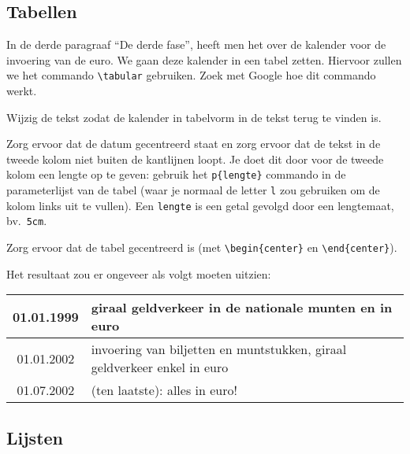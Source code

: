 \documentclass[12pt, dutch]{article}
\newcommand{\bs}{\textbackslash}
\begin{document}
\subsection{Tabellen}

In de derde paragraaf ``De derde fase'', heeft men het over de
kalender voor de invoering van de euro. We gaan deze kalender in een
tabel zetten. Hiervoor zullen we het commando \texttt{\bs{}tabular}
gebruiken. Zoek met Google hoe dit commando werkt.
\begin{tcolorbox}[title=Opgave 5a]
  Wijzig de tekst zodat de kalender in tabelvorm in de tekst terug te vinden is.
\end{tcolorbox}
Zorg ervoor dat de datum gecentreerd staat en zorg ervoor dat de
tekst in de tweede kolom niet buiten de kantlijnen loopt. Je doet dit
door voor de tweede kolom een lengte op te geven: gebruik het
\texttt{p\{lengte\}} commando in de parameterlijst van de
tabel (waar je normaal de letter \texttt{l} zou gebruiken om de kolom
links uit te vullen). Een \texttt{lengte} is een getal gevolgd door een
lengtemaat, bv.\ \texttt{5cm}.

\begin{tcolorbox}[title=Opgave 5b]
  Zorg ervoor dat de tabel gecentreerd is (met \texttt{\bs{}begin\{center\}} en
  \texttt{\bs{}end\{center\}}).
\end{tcolorbox}

Het resultaat zou er ongeveer als volgt moeten uitzien:

\begin{center}
  \begin{tabular}{|c|p{7cm}|}
    \hline
    01.01.1999 & giraal geldverkeer in de nationale munten en in euro                     \\ \hline
    01.01.2002 & invoering van biljetten en muntstukken, giraal geldverkeer enkel in euro \\ \hline
    01.07.2002 & (ten laatste): alles in euro!                                            \\ \hline
  \end{tabular}
\end{center}

\subsection{Lijsten}
\end{document}
